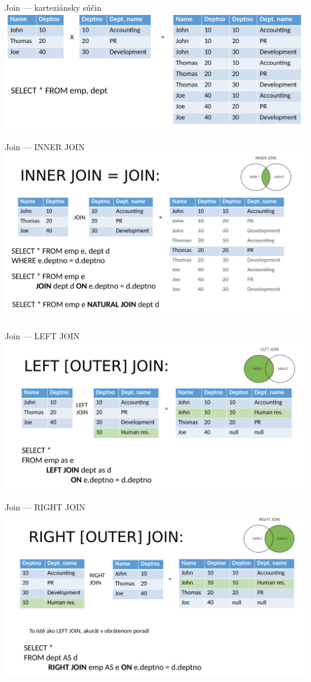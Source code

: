 \documentclass[12pt]{beamer}
\begin{document}
\begin{frame}{Join --- karteziánsky súčin}
\includegraphics[scale=.12]{join1}
\end{frame}

\begin{frame}{Join --- INNER JOIN}
\includegraphics[scale=.12]{join2}
\end{frame}

\begin{frame}{Join --- LEFT JOIN}
\includegraphics[scale=.12]{join3}
\end{frame}

\begin{frame}{Join --- RIGHT JOIN}
\includegraphics[scale=.12]{join4}
\end{frame}
\end{document}
